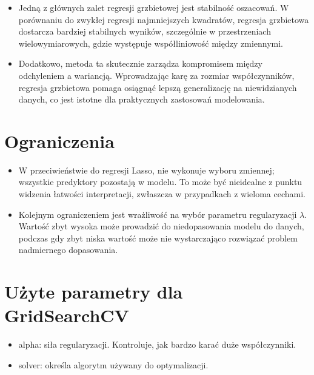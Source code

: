 \begin{itemize}
\item Jedną z głównych zalet regresji grzbietowej jest stabilność oszacowań. W porównaniu do zwykłej regresji najmniejszych kwadratów, regresja grzbietowa dostarcza bardziej stabilnych wyników, szczególnie w przestrzeniach wielowymiarowych, gdzie występuje współliniowość między zmiennymi. 

\item Dodatkowo, metoda ta skutecznie zarządza kompromisem między odchyleniem a wariancją. Wprowadzając karę za rozmiar współczynników, regresja grzbietowa pomaga osiągnąć lepszą generalizację na niewidzianych danych, co jest istotne dla praktycznych zastosowań modelowania.
\end{itemize}

{}
\section*{Ograniczenia}
\vspace{-1.0em}


\begin{itemize}
\item W przeciwieństwie do regresji Lasso, nie wykonuje wyboru zmiennej; wszystkie predyktory pozostają w modelu. To może być nieidealne z punktu widzenia łatwości interpretacji, zwłaszcza w przypadkach z wieloma cechami.

\item Kolejnym ograniczeniem jest wrażliwość na wybór parametru regularyzacji $\lambda$. Wartość zbyt wysoka może prowadzić do niedopasowania modelu do danych, podczas gdy zbyt niska wartość może nie wystarczająco rozwiązać problem nadmiernego dopasowania.
\end{itemize}

{}
\section*{Użyte parametry dla GridSearchCV \cite{url_Ridge, url_grid_search}}
\vspace{-1.0em}

\begin{itemize}
\item {alpha}: siła regularyzacji. Kontroluje, jak bardzo karać duże współczynniki.

\item {solver}: określa algorytm używany do optymalizacji.
\end{itemize}
\noindent\makebox[\linewidth]{\rule{\paperwidth}{0.4pt}}
